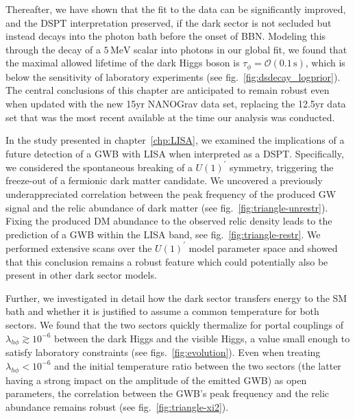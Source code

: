 Thereafter, we have shown that the fit to the data can be significantly improved, and the \ac{DSPT} interpretation preserved, if the dark sector is not secluded but instead decays into the photon bath before  the onset of \ac{BBN}. Modeling this through the decay of a $5 \, \text{MeV}$ scalar into photons in our global fit, we found that the maximal allowed lifetime of the dark Higgs boson is $\tau_\phi = \mathcal{O}(0.1 \, \text{s})$, which is below the sensitivity of laboratory experiments (see fig.~\ref{fig:dsdecay_logprior}). The central conclusions of this chapter are anticipated to remain robust even when updated with the new 15yr \ac{NANOGrav} data set, replacing the 12.5yr data set that was the most recent available at the time our analysis was conducted.

In the study presented in chapter~\ref{chp:LISA}, we examined the implications of a future detection of a \ac{GWB} with \acs{LISA} when interpreted as a \ac{DSPT}. Specifically, we considered the spontaneous breaking of a $U(1)^\prime$ symmetry, triggering the freeze-out of a fermionic dark matter candidate. We uncovered a previously underappreciated correlation  between the peak frequency of the produced \ac{GW} signal and the relic abundance of dark matter (see fig.~\ref{fig:triangle-unrestr}).  Fixing the produced \ac{DM} abundance to the observed relic density leads to the prediction of a \ac{GWB} within the \acs{LISA} band, see fig.~\ref{fig:triangle-restr}. We performed extensive scans over the $U(1)^\prime$ model parameter space and showed that this conclusion remains a robust feature which could potentially also be present in other dark sector models.

Further, we investigated in detail how the dark sector transfers energy to the \ac{SM} bath and whether it is justified to assume a common temperature for both sectors. We found that the two sectors quickly thermalize for portal couplings of $\lambda_{h\phi} \gtrsim 10^{-6}$ between   the dark Higgs and the visible Higgs, a value small enough to satisfy laboratory constraints (see figs.~\ref{fig:evolution}). Even when treating $\lambda_{h\phi} < 10^{-6}$ and the initial temperature ratio between the two sectors (the latter having a strong impact on the amplitude of the emitted \ac{GWB}) as open parameters, the correlation between the \ac{GWB}'s peak frequency and the relic abundance remains robust (see fig.~\ref{fig:triangle-xi2}).

